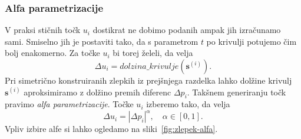 \documentclass[isrm2, tisk]{fmfdelo}
\begin{document}
    \subsubsection{Alfa parametrizacije}
    V praksi stičnih točk $u_i$ dostikrat ne dobimo podanih ampak jih izračunamo sami.
    Smiselno jih je postaviti tako, da s parametrom $t$ po krivulji potujemo čim bolj enakomerno.
    Za točke $u_i$ bi torej želeli, da velja \[\Delta u_i = dolzina\_krivulje(\mathbf{s}^{(i)}).\]
    Pri simetrično konstruiranih zlepkih iz prejšnjega razdelka lahko dolžine krivulj $\mathbf{s}^{(i)}$ aproksimiramo z dolžino premih diferenc $\Delta p_i$.
    Takšnem generiranju točk pravimo \textit{alfa parametrizacije}.
    Točke $u_i$ izberemo tako, da velja
    \[\Delta u_i=|\Delta p_i|^{\alpha},\quad \alpha\in[0,1].\]
    Vpliv izbire alfe si lahko ogledamo na sliki~\ref{fig:zlepek-alfa}.
\end{document}
